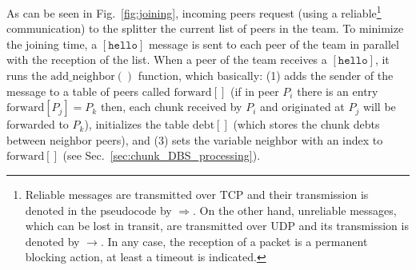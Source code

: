 \label{sec:peer_joining}
\begin{figure*}
   \caption{Procedures involved in a peer
    joining.\label{fig:joining}}
\end{figure*}

As can be seen in Fig.~\ref{fig:joining}, incoming peers request
(using a reliable\footnote{Reliable messages are transmitted over TCP
and their transmission is denoted in the pseudocode by
$\Rightarrow$. On the other hand, unreliable messages, which can be
lost in transit, are transmitted over UDP and its transmission is
denoted by $\rightarrow$. In any case, the reception of a packet is a
permanent blocking action, at least a timeout is indicated.}
communication) to the splitter the current list of peers in the
team. To minimize the joining time, a $[\mathtt{hello}]$ message is
sent to each peer of the team in parallel with the reception of the
list. When a peer of the team receives a $[\mathtt{hello}]$, it runs
the $\mathrm{add}\_\mathrm{neighbor}()$ function, which basically: (1)
adds the sender of the message to a table of peers called
$\mathrm{forward}[]$ (if in peer $P_i$ there is an entry
$\mathrm{forward}[P_j]=P_k$ then, each chunk received by $P_i$ and
originated at $P_j$ will be forwarded to $P_k$), initializes the table
$\mathrm{debt}[]$ (which stores the chunk debts between neighbor
peers), and (3) sets the variable $\mathrm{neighbor}$ with an index to
$\mathrm{forward}[]$ (see Sec.~\ref{sec:chunk_DBS_processing}).
